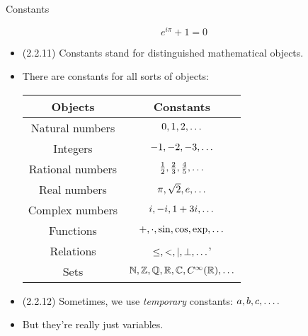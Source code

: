 \begin{frame}{Constants}

\[e^{i\pi}+1=0\]
	
	\begin{itemize}
	
		\item (2.2.11) Constants stand for distinguished mathematical objects.
		
		\item There are constants for all sorts of objects:
		
			\begin{center}
				\begin{tabular}{c | c}
				Objects & Constants\\\hline
				Natural numbers & $0,1,2,\mathellipsis$\\
				Integers & $-1, -2, -3, \mathellipsis$\\
				Rational numbers & $\frac{1}{2}, \frac{2}{3}, \frac{4}{5},\mathellipsis$\\
				Real numbers & $\pi,\sqrt{2}, e,\mathellipsis$\\
				Complex numbers & $i, -i, 1+3i,\mathellipsis$\\
				Functions & $+, \cdot, \sin,\cos, \exp,\mathellipsis$\\
				Relations & $\leq, <, |, \bot,\mathellipsis$'\\
				Sets & $\mathbb{N}, \mathbb{Z}, \mathbb{Q}, \mathbb{R},\mathbb{C}, C^\infty(\mathbb{R}),\mathellipsis$ 
				\end{tabular}
			\end{center}
			
		\item (2.2.12) Sometimes, we use \emph{temporary} constants: $a,b,c,\mathellipsis.$
		
		\item But they're really just variables.
	
	\end{itemize}

\end{frame}

